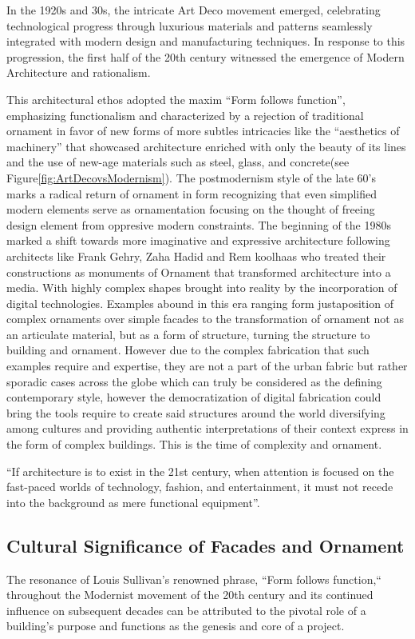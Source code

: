 In the 1920s and 30s, the intricate Art Deco movement emerged, celebrating technological progress through luxurious materials and patterns seamlessly integrated with modern design and manufacturing techniques.
In response to this progression, the first half of the 20th century witnessed the emergence of Modern Architecture and rationalism.

This architectural ethos adopted the maxim ``Form follows function'', emphasizing functionalism and characterized by a rejection of traditional ornament in favor of new forms of more subtles intricacies like the “aesthetics of machinery” that showcased architecture  enriched  with  only  the  beauty of its lines and the use of new-age materials such as steel, glass, and concrete\cite{Gage2015}(see Figure\ref{fig:ArtDecovsModernism}).
The postmodernism style of the late 60's marks a radical return of ornament in form recognizing that even simplified modern elements serve as ornamentation focusing on the thought of freeing design element from oppresive modern constraints.
The  beginning  of  the  1980s marked a shift towards more imaginative and expressive architecture following architects like Frank Gehry, Zaha Hadid and Rem koolhaas who treated their constructions as monuments of Ornament that transformed architecture into a media.
With highly complex shapes brought into reality by the incorporation of digital technologies.
Examples abound in this era ranging form justaposition of complex ornaments over simple facades to the transformation of ornament not as an articulate material, but as a form of structure, turning the structure to building and ornament.
However due to the complex fabrication that such examples require and expertise, they are not a part of the urban fabric but rather sporadic cases across the globe which can truly be considered as the defining contemporary style, however the democratization of digital fabrication could bring the tools require to create said structures around the world diversifying among cultures and providing authentic interpretations of their context express in the form of complex buildings. This is the time of complexity and ornament.

``If architecture is to exist in the 21st century, when attention is focused on the fast-paced worlds of technology, fashion, and entertainment, it must not recede into the background as mere functional equipment''\cite{Gage2015}.


\subsection{Cultural Significance of Facades and Ornament}
\label{subsec: FacadeandOrnament }
The resonance of Louis Sullivan's renowned phrase, ``Form follows function,`` throughout the Modernist movement of the 20th century and its continued influence on subsequent decades can be attributed to the pivotal role of a building's purpose and functions as the genesis and core of a project\cite{Hnin2022}.

